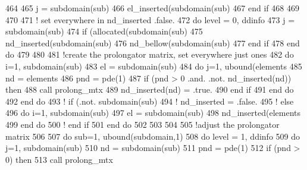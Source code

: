 \begin{DoxyCode}
464           
465           j = subdomain(sub)%
466           el\_inserted(subdomain(sub)%
467 \textcolor{keywordflow}{        end if}
468           
469 
470 
471         \textcolor{comment}{! set everywhere in nd\_inserted .false.}
472         \textcolor{keywordflow}{do} level = 0, ddinfo%
473           j = subdomain(sub)%
474           \textcolor{keywordflow}{if} (\textcolor{keyword}{allocated}(subdomain(sub)%
475             nd\_inserted(subdomain(sub)%
476             nd\_bellow(subdomain(sub)%
477 \textcolor{keywordflow}{          end if}
478 \textcolor{keywordflow}{        end do}
479         
480 
481         \textcolor{comment}{!create the prolongator matrix, set everywhere just ones }
482         \textcolor{keywordflow}{do} i=1, subdomain(sub)%
483           el = subdomain(sub)%
484           \textcolor{keywordflow}{do} j=1, ubound(elements%
485             nd = elements%
486             pnd = pde(1)%
487             \textcolor{keywordflow}{if} (pnd > 0 .and. .not. nd\_inserted(nd)) \textcolor{keywordflow}{then}
488               \textcolor{keyword}{call }prolong_mtx%
489               nd\_inserted(nd) = .true.
490 \textcolor{keywordflow}{            end if}
491 \textcolor{keywordflow}{          end do}
492 \textcolor{keywordflow}{        end do}
493 \textcolor{comment}{!       if (.not. subdomain(sub)%
494 \textcolor{comment}{!         nd\_inserted = .false.}
495 \textcolor{comment}{!       else}
496           \textcolor{keywordflow}{do} i=1, subdomain(sub)%
497             el = subdomain(sub)%
498             nd\_inserted(elements%
499 \textcolor{keywordflow}{          end do}
500 \textcolor{comment}{!         end if}
501 \textcolor{keywordflow}{      end do}
502       
503 
504       
505       \textcolor{comment}{!adjust the prolongator matrix}
506       
507       \textcolor{keywordflow}{do} sub=1, ubound(subdomain,1)
508         \textcolor{keywordflow}{do} level = 1, ddinfo%
509           \textcolor{keywordflow}{do} j=1, subdomain(sub)%
510             nd = subdomain(sub)%
511             pnd = pde(1)%
512             \textcolor{keywordflow}{if} (pnd > 0) \textcolor{keywordflow}{then}
513               \textcolor{keyword}{call }prolong_mtx%
}
\end{DoxyCode}
